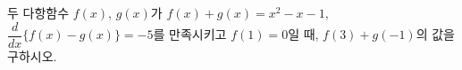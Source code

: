 두 다항함수 $f(x)$, $g(x)$가 $f(x)+g(x)=x^2-x-1$, $\dfrac{d}{dx}\{f(x)-g(x)\}=-5$를 만족시키고 $f(1)=0$일 때, $f(3)+g(-1)$의 값을 구하시오.
